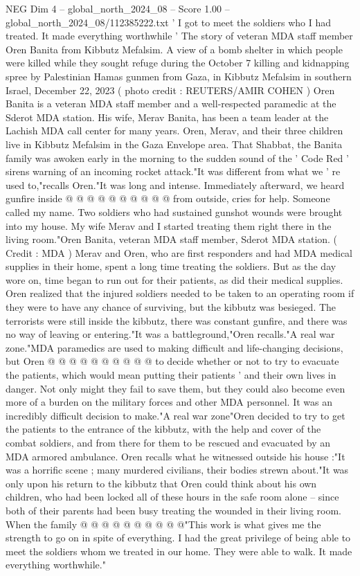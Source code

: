 \begin{textsample}{NEG Dim 4 – global\_north\_2024\_08 – Score 1.00 – global\_north\_2024\_08/112385222.txt}  \label{ex:f4_neg_308}
' I got to meet the soldiers who I had treated.
It made everything worthwhile ' The story of veteran MDA staff member Oren Banita from Kibbutz Mefalsim.
A view of a bomb shelter in which people were killed while they sought refuge during the October 7 killing and kidnapping spree by Palestinian Hamas gunmen from Gaza, in Kibbutz Mefalsim in southern Israel, December 22, 2023 ( photo credit : REUTERS/AMIR COHEN ) Oren Banita is a veteran MDA staff member and a well-respected paramedic at the Sderot MDA station.
His wife, Merav Banita, has been a team leader at the Lachish MDA call center for many years.
Oren, Merav, and their three children live in Kibbutz Mefalsim in the Gaza Envelope area.
That Shabbat, the Banita family was awoken early in the morning to the sudden sound of the ' Code Red ' sirens warning of an incoming rocket attack."It was different from what we ' re used to,"recalls Oren."It was long and intense.
Immediately afterward, we heard gunfire inside @ @ @ @ @ @ @ @ @ @ from outside, cries for help.
Someone called my name.
Two soldiers who had sustained gunshot wounds were brought into my house.
My wife Merav and I started treating them right there in the living room."Oren Banita, veteran MDA staff member, Sderot MDA station. ( Credit : MDA ) Merav and Oren, who are first responders and had MDA medical supplies in their home, spent a long time treating the soldiers.
But as the day wore on, time began to run out for their patients, as did their medical supplies.
Oren realized that the injured soldiers needed to be taken to an operating room if they were to have any chance of surviving, but the kibbutz was besieged.
The terrorists were still inside the kibbutz, there was constant gunfire, and there was no way of leaving or entering."It was a battleground,"Oren recalls."A real war zone."MDA paramedics are used to making difficult and life-changing decisions, but Oren @ @ @ @ @ @ @ @ @ @ to decide whether or not to try to evacuate the patients, which would mean putting their patients ' and their own lives in danger.
Not only might they fail to save them, but they could also become even more of a burden on the military forces and other MDA personnel.
It was an incredibly difficult decision to make."A real war zone"Oren decided to try to get the patients to the entrance of the kibbutz, with the help and cover of the combat soldiers, and from there for them to be rescued and evacuated by an MDA armored ambulance.
Oren recalls what he witnessed outside his house :"It was a horrific scene ; many murdered civilians, their bodies strewn about."It was only upon his return to the kibbutz that Oren could think about his own children, who had been locked all of these hours in the safe room alone -- since both of their parents had been busy treating the wounded in their living room.
When the family @ @ @ @ @ @ @ @ @ @"This work is what gives me the strength to go on in spite of everything.
I had the great privilege of being able to meet the soldiers whom we treated in our home.
They were able to walk.
It made everything worthwhile."

\end{textsample}
